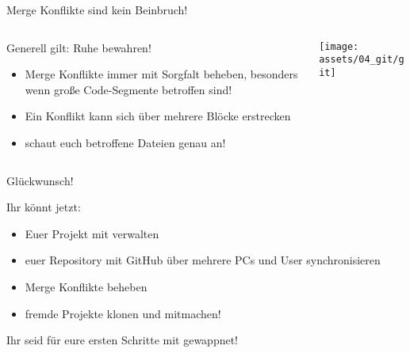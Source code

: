 
\begin{frame}{Merge Konflikte sind kein Beinbruch!}
	\begin{columns}[onlytextwidth]
		\begin{column}{0.6\textwidth}
			Generell gilt: Ruhe bewahren!
			\begin{itemize}
				\item Merge Konflikte immer mit Sorgfalt beheben, besonders wenn große Code-Segmente betroffen sind!
				\item Ein Konflikt kann sich über mehrere Blöcke erstrecken
				\item schaut euch betroffene Dateien genau an!
			\end{itemize}
		\end{column}
		\begin{column}{0.4\textwidth}
			\flushright \texttt{[image: assets/04\_git/git]}
		\end{column}
	\end{columns}
\end{frame}

\begin{frame}
	\centering \Large \alert{Glückwunsch!}
	\vfill

	\normalsize Ihr könnt jetzt:
	\begin{itemize}
		\item Euer Projekt mit \git verwalten
		\item euer Repository mit GitHub über mehrere PCs und User synchronisieren
		\item Merge Konflikte beheben
		\item fremde Projekte klonen und mitmachen!
	\end{itemize}
	Ihr seid für eure ersten Schritte mit \git gewappnet!
\end{frame}

